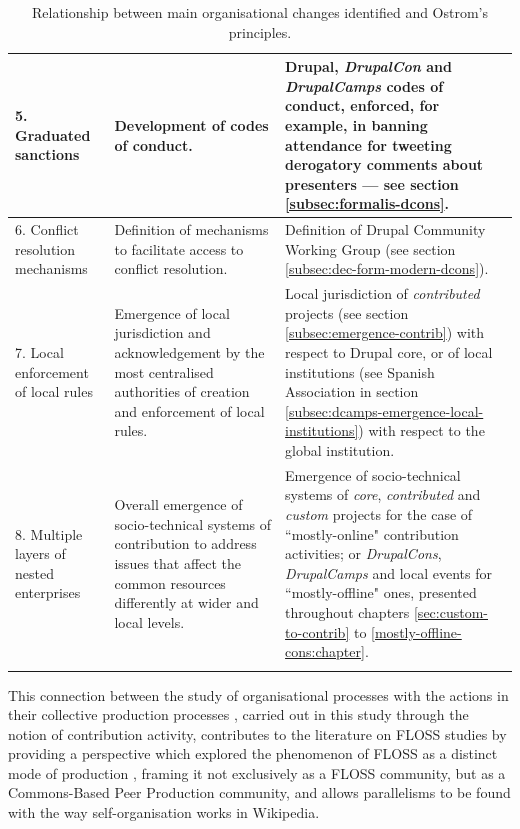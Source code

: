\begin{footnotesize}
\begin{longtable}{|p{3cm}||p{4.7cm}|p{5.5cm}|}
 \\ \hline
5. Graduated sanctions
&
Development of codes of conduct.
&
Drupal, \textit{DrupalCon} and \textit{DrupalCamps} codes of conduct, enforced, for example, in banning attendance for tweeting derogatory comments about presenters ---  see section \ref{subsec:formalis-dcons}.
\\ \hline
6. Conflict resolution mechanisms
&
Definition of mechanisms to facilitate access to conflict resolution.
&
Definition of Drupal Community Working Group (see section \ref{subsec:dec-form-modern-dcons}).
\\ \hline
7. Local enforcement of local rules
&
Emergence of local jurisdiction and acknowledgement by the most centralised authorities of creation and enforcement of local rules. &
Local jurisdiction of \textit{contributed} projects (see section \ref{subsec:emergence-contrib}) with respect to Drupal core, or of local institutions (see Spanish Association in section \ref{subsec:dcamps-emergence-local-institutions}) with respect to the global institution.
\\ \hline
8. Multiple layers of nested enterprises
&
Overall emergence of socio-technical systems of contribution to address issues that affect the common resources differently at wider and local levels.
&
Emergence of socio-technical systems of \textit{core}, \textit{contributed} and \textit{custom} projects for the case of ``mostly-online" contribution activities; or \textit{DrupalCons}, \textit{DrupalCamps} and local events for ``mostly-offline" ones, presented throughout chapters \ref{sec:custom-to-contrib} to \ref{mostly-offline-cons:chapter}.
\\ \hline
\caption{Relationship between main organisational changes identified and Ostrom's principles.}
\label{tab:ostrom}
\end{longtable}
\end{footnotesize}

This connection between the study of organisational processes with the actions in their collective production processes \parencite{Mahony2011}, carried out in this study through the notion of contribution activity, contributes to the literature on FLOSS studies by providing a perspective which explored the phenomenon of FLOSS as a distinct mode of production \parencite{glaser2007social}, framing it not exclusively as a FLOSS community, but as a Commons-Based Peer Production community, and allows parallelisms to be found with the way self-organisation works in Wikipedia.


